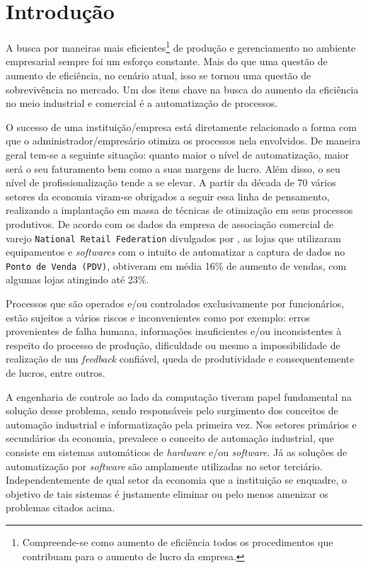 \chapter[Introdução]{Introdução}
A busca por maneiras mais eficientes\footnote{Compreende-se como aumento de eficiência todos os procedimentos que contribuam para o
aumento de lucro da empresa.} de produção e gerenciamento no ambiente empresarial sempre foi um esforço constante. Mais do que uma 
questão de aumento de eficiência, no cenário atual, isso se tornou uma questão de sobrevivência no mercado. Um dos itens chave na busca 
do aumento da eficiência no meio industrial e comercial é a automatização de processos. 

O sucesso de uma instituição/empresa está diretamente relacionado a forma com que o administrador/empresário otimiza os processos nela 
envolvidos. De maneira geral tem-se a seguinte situação: quanto maior o nível de automatização, maior será o seu faturamento bem como a
suas margens de lucro. Além disso, o seu nível de profissionalização tende a se elevar. A partir da década de 70 vários setores da economia 
viram-se obrigados a seguir essa linha de pensamento, realizando a implantação em massa de técnicas de otimização em seus processos produtivos. 
De acordo com os dados da empresa de associação comercial de varejo \texttt{National Retail Federation} divulgados por \cite{beitol2015}, as 
lojas que utilizaram equipamentos e \textit{softwares} com o intuito de automatizar a captura de dados no \texttt{Ponto de Venda (PDV)}, obtiveram em 
média 16\% de aumento de vendas, com algumas lojas atingindo até 23\%.

Processos que são operados e/ou controlados exclusivamente por funcionários, estão sujeitos a vários riscos e inconvenientes como por exemplo: 
erros provenientes de falha humana, informações insuficientes e/ou inconsistentes à respeito do processo de produção, dificuldade ou mesmo a
impossibilidade de realização de um \textit{feedback} confiável, queda de produtividade e consequentemente de lucros, entre outros.

A engenharia de controle ao lado da computação tiveram papel fundamental na solução desse problema, sendo responsáveis pelo surgimento dos 
conceitos de automação industrial e informatização pela primeira vez. Nos setores primários e secundários da economia, prevalece o conceito 
de automação industrial, que consiste em sistemas automáticos de \textit{hardware} e/ou \textit{software}. Já as soluções de automatização 
por \textit{software} são amplamente utilizadas no setor terciário. Independentemente de qual setor da economia que a instituição se enquadre, 
o objetivo de tais sistemas é justamente eliminar ou pelo menos amenizar os problemas citados acima. 

